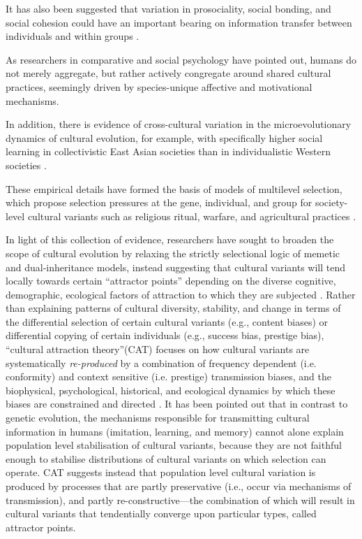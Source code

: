 It has also been suggested that variation in prosociality, social bonding, and social cohesion could have an important bearing on information transfer between individuals and within groups \citep{Heyes2011,Whitehouse2014,Wheatley2016}.

As researchers in comparative and social psychology have pointed out, humans do not merely aggregate, but rather actively congregate around shared cultural practices, seemingly driven by species-unique affective and motivational mechanisms\citep{Dunbar2010,Tomasello2005a}.

In addition, there is evidence of cross-cultural variation in the microevolutionary dynamics of cultural evolution, for example, with specifically higher social learning in collectivistic East Asian societies than in individualistic Western societies \citep{Mesoudi2015,DiYanni2015}.

These empirical details have formed the basis of models of multilevel selection, which propose selection pressures at the gene, individual, and group for society-level cultural variants such as religious ritual, warfare, and agricultural practices  \citep{Turchin2013,Atkinson2011a}.

In light of this collection of evidence, researchers have sought to broaden the scope of cultural evolution by relaxing the strictly selectional logic of memetic and dual-inheritance models, instead suggesting that cultural variants will tend locally towards certain ``attractor points'' depending on the diverse cognitive, demographic, ecological factors of attraction to which they are subjected \citep{Sperber1996}.  Rather than explaining patterns of cultural diversity, stability, and change in terms of the differential selection of certain cultural variants (e.g., content biases) or differential copying of certain individuals (e.g., success bias, prestige bias),  ``cultural attraction theory''(CAT) focuses on how cultural variants are systematically \textit{re-produced} by a combination of frequency dependent (i.e. conformity) and context sensitive (i.e. prestige) transmission biases, and the biophysical, psychological, historical, and ecological dynamics by which these biases are constrained and directed \citep{Claidiere2014}.  It has been pointed out that in contrast to genetic evolution, the mechanisms responsible for transmitting cultural information in humans (imitation, learning, and memory) cannot alone explain population level stabilisation of cultural variants, because they are not faithful enough to stabilise distributions of cultural variants on which selection can operate\cite{Claidiere2014}. CAT suggests instead that population level cultural variation is produced by processes that are partly preservative (i.e., occur via mechanisms of transmission), and partly re-constructive---the combination of which will result in cultural variants that tendentially converge upon particular types, called attractor points.

